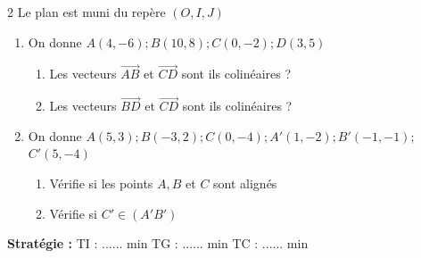 \begin{multicols*}{2}
  	 Le plan est muni du repère $(O, I, J)$
  	\begin{enumerate}
  		\item On donne $A(4, -6); B(10, 8); C(0, -2); D(3, 5)$
  		\begin{enumerate}
  			\item Les vecteurs $\overrightarrow{AB}$ et $\overrightarrow{CD}$ sont ils colinéaires ?
  			\item Les vecteurs $\overrightarrow{BD}$ et $\overrightarrow{CD}$ sont ils colinéaires ?
  		\end{enumerate}
  		\item On donne $A(5, 3); B(-3, 2); C(0, -4); A'(1, -2); B'(-1, -1)$;  $C'(5, -4)$
  		\begin{enumerate}
  			\item Vérifie si les points $A, B$ et $C$ sont alignés
  			\item Vérifie si $C' \in (A'B')$
  		\end{enumerate}
  	\end{enumerate}
  	\textbf{Stratégie :} TI : ...... min \quad TG : ...... min \quad TC : ...... min
  	

\end{multicols*}
